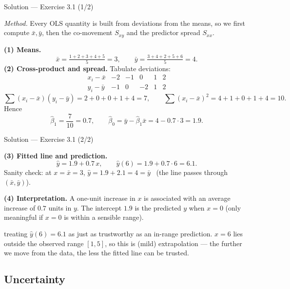 \documentclass[aspectratio=169,11pt]{beamer}
\begin{document}
\begin{frame}{Solution --- Exercise 3.1 (1/2)}
  \begin{solutionbox}
    \emph{Method.} Every OLS quantity is built from deviations from the
    means, so we first compute $\bar x,\bar y$, then the co-movement
    $S_{xy}$ and the predictor spread $S_{xx}$.

    \textbf{(1) Means.}
    \[
      \bar x = \tfrac{1+2+3+4+5}{5}=3, \qquad
      \bar y = \tfrac{3+4+2+5+6}{5}=4.
    \]
    \textbf{(2) Cross-product and spread.} Tabulate deviations:
    \[
      \begin{array}{c|ccccc}
        x_i-\bar x & -2 & -1 & 0 & 1 & 2\\
        y_i-\bar y & -1 & 0 & -2 & 1 & 2
      \end{array}
    \]
    \[
      \sum (x_i-\bar x)(y_i-\bar y) = 2+0+0+1+4 = 7,\qquad
      \sum (x_i-\bar x)^2 = 4+1+0+1+4 = 10.
    \]
    Hence
    \[
      \hat\beta_1 = \frac{7}{10}=0.7,\qquad
      \hat\beta_0 = \bar y - \hat\beta_1\bar x = 4-0.7\cdot 3 = 1.9.
    \]
  \end{solutionbox}
\end{frame}

\begin{frame}{Solution --- Exercise 3.1 (2/2)}
  \begin{solutionbox}
    \textbf{(3) Fitted line and prediction.}
    \[
      \hat y = 1.9 + 0.7\,x, \qquad
      \hat y(6) = 1.9 + 0.7\cdot 6 = 6.1.
    \]
    Sanity check: at $x=\bar x=3$, $\hat y = 1.9+2.1 = 4 = \bar y$
    \checkmark\ (the line passes through $(\bar x,\bar y)$).

    \textbf{(4) Interpretation.} A one-unit increase in $x$ is
    associated with an average increase of $0.7$ units in $y$.
    The intercept $1.9$ is the predicted $y$ when $x=0$ (only
    meaningful if $x=0$ is within a sensible range).
  \end{solutionbox}
  \begin{mistake}
    treating $\hat y(6)=6.1$ as just as
    trustworthy as an in-range prediction. $x=6$ lies outside the
    observed range $[1,5]$, so this is (mild) extrapolation --- the
    further we move from the data, the less the fitted line can be
    trusted.
  \end{mistake}
\end{frame}

\subsection{Uncertainty}
\end{document}
